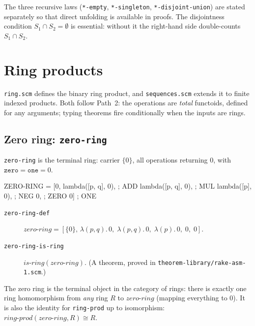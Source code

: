 \begin{remark}
The three recursive laws (\texttt{*-empty},
\texttt{*-singleton}, \texttt{*-disjoint-union}) are stated separately so that direct
unfolding is available in proofs.  The disjointness condition
$S_1 \cap S_2 = \emptyset$ is essential: without it the right-hand side
double-counts $S_1 \cap S_2$.
\end{remark}

\section{Ring products}
\label{sec:ring-prod}

\texttt{ring.scm} defines the binary ring product, and
\texttt{sequences.scm} extends it to finite indexed products.
Both follow Path~2: the operations are \emph{total} functoids, defined
for any arguments; typing theorems fire conditionally when the inputs
are rings.

\subsection{Zero ring: \texttt{zero-ring}}

\texttt{zero-ring} is the terminal ring: carrier $\{0\}$, all operations
returning $0$, with $\mathtt{zero} = \mathtt{one} = 0$.

\begin{VNBsnip}
ZERO-RING = [{0},
             lambda([p, q], 0),   ; ADD
             lambda([p, q], 0),   ; MUL
             lambda([p], 0),      ; NEG
             0,                   ; ZERO
             0]                   ; ONE
\end{VNBsnip}

\begin{description}
\item[\texttt{zero-ring-def}]
  $\mathit{zero\text{-}ring} = [\{0\},\,
   \lambda(p,q).\,0,\; \lambda(p,q).\,0,\; \lambda(p).\,0,\; 0,\; 0]$.
\item[\texttt{zero-ring-is-ring}]
  $\mathit{is\text{-}ring}(\mathit{zero\text{-}ring})$.
  (A theorem, proved in \texttt{theorem-library/rake-asm-1.scm}.)
\end{description}

\begin{remark}
The zero ring is the terminal object in the category of rings: there is
exactly one ring homomorphism from \emph{any} ring $R$ to
$\mathit{zero\text{-}ring}$ (mapping everything to $0$).  It is also
the identity for \texttt{ring-prod} up to isomorphism:
$\mathit{ring\text{-}prod}(\mathit{zero\text{-}ring}, R) \cong R$.
\end{remark}

